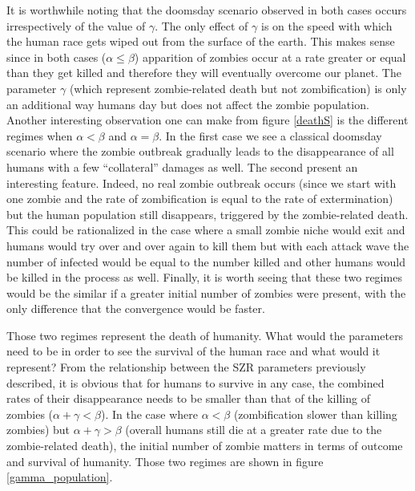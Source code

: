 \documentclass[11pt]{article} %
\begin{document}
It is worthwhile noting that the doomsday scenario observed in both cases occurs irrespectively of the value of $\gamma$. The only effect of $\gamma$ is on the speed with which the human race gets wiped out from the surface of the earth. This makes sense since in both cases ($\alpha\leq\beta$) apparition of zombies occur at a rate greater or equal than they get killed and therefore they will eventually overcome our planet. The parameter $\gamma$ (which represent zombie-related death but not zombification) is only an additional way humans day but does not affect the zombie population. Another interesting observation one can make from figure \ref{deathS} is the different regimes when $\alpha<\beta$ and $\alpha=\beta$. In the first case we see a classical doomsday scenario where the zombie outbreak gradually leads to the disappearance of all humans with a few ``collateral'' damages as well. The second present an interesting feature. Indeed, no real zombie outbreak occurs (since we start with one zombie and the rate of zombification is equal to the rate of extermination) but the human population still disappears, triggered by the zombie-related death. This could be rationalized in the case where a small zombie niche would exit and humans would try over and over again to kill them but with each attack wave the number of infected would be equal to the number killed and other humans would be killed in the process as well. Finally, it is worth seeing that these two regimes would be the similar if a greater initial number of zombies were present, with the only difference that the convergence would be faster. 

Those two regimes represent the death of humanity. What would the parameters need to be in order to see the survival of the human race and what would it represent? From the relationship between the SZR parameters previously described, it is obvious that  for humans to survive in any case, the combined rates of their disappearance needs to be smaller than that of the killing of zombies ($\alpha+\gamma<\beta$). In the case where $\alpha<\beta$ (zombification slower than killing zombies) but  $\alpha+\gamma>\beta$ (overall humans still die at a greater rate due to the zombie-related death), the initial number of zombie matters in terms of outcome and survival of humanity. Those two regimes are shown in figure \ref{gamma_population}.
\end{document}
